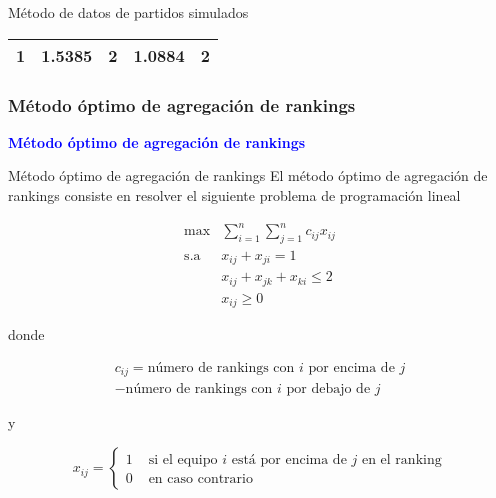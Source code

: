 \documentclass[10pt,hyperref={unicode}]{beamer}
\begin{document}
\begin{frame}{Método de datos de partidos simulados}
\begin{ejemplo}[continuación]
\begin{table}[h]
\begin{tabular}{@{}ccccc@{}}
				1 & 1.5385                                                           & 2                                                          & 1.0884                                                           & 2                                                          \\ \bottomrule
			\end{tabular}
		\end{table}
			
		\end{ejemplo}
	\end{frame}
	
	\subsubsection{Método óptimo de agregación de rankings}
	
	\begin{frame}
		\begin{center}
			\Huge\textbf{\textsf{\textcolor{blue}{Método óptimo de agregación de rankings}}}
		\end{center}
	\end{frame}
	
	\begin{frame}{Método óptimo de agregación de rankings}
		El método óptimo de agregación de rankings consiste en resolver el siguiente problema de programación lineal
		
		 \begin{equation}
		 \begin{array}{rl}
		 \max         & \sum\limits_{i=1}^{n} \sum\limits_{j=1}^{n} c_{ij} x_{ij}\\
		 \mathrm{s.a} & x_{ij} + x_{ji} = 1\\
		 & x_{ij} + x_{jk} + x_{ki} \leq 2\\
		 & x_{ij} \geq 0
		 \end{array}
		 \end{equation}
		 
		 donde 
		 
		 \begin{multline} \label{eq:conformidad}
		 c_{ij} = \text{número de rankings con $i$ por encima de $j$} \\ - \text{número de rankings con $i$ por debajo de $j$}
		 \end{multline}
		 
		 y
		 
		 \begin{equation}
		 x_{ij} = \begin{cases}
		 1 & \text{ si el equipo $i$ está por encima de $j$ en el ranking}\\
		 0 & \text{ en caso contrario}
		 \end{cases}
		 \end{equation}
	\end{frame}
	
\end{document}
